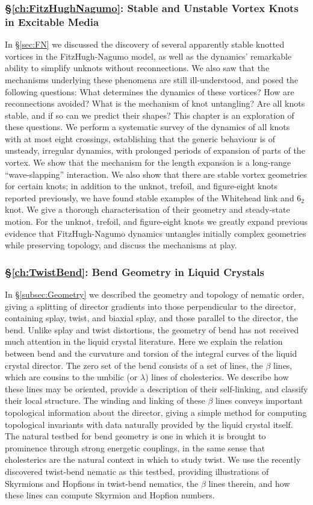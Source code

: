 \subsubsection{\S \ref{ch:FitzHughNagumo}: Stable and Unstable Vortex Knots in Excitable Media}
In \S \ref{sec:FN} we discussed the discovery of several apparently stable knotted vortices in the FitzHugh-Nagumo model, as well as the dynamics' remarkable ability to simplify unknots without reconnections. We also saw that the mechanisms underlying these phenomena are still ill-understood, and posed the following questions: What determines the dynamics of these vortices? How are reconnections avoided? What is the mechanism of knot untangling? Are all knots stable, and if so can we predict their shapes? This chapter is an exploration of these questions. We perform a systematic survey of the dynamics of all knots with at most eight crossings, establishing that the generic behaviour is of unsteady, irregular dynamics, with prolonged periods of expansion of parts of the vortex. We show that the mechanism for the length expansion is a long-range “wave-slapping” interaction. We also show that there are stable vortex geometries for certain knots; in addition to the unknot, trefoil, and figure-eight knots reported previously, we have found stable examples of the Whitehead link and $6_2$ knot. We give a thorough characterisation of their geometry and steady-state motion. For the unknot, trefoil, and figure-eight knots we greatly expand previous evidence that FitzHugh-Nagumo dynamics untangles initially complex geometries while preserving topology, and discuss the mechanisms at play.

\subsubsection{\S \ref{ch:TwistBend}: Bend Geometry in Liquid Crystals}
In \S\ref{subsec:Geometry} we described the geometry and topology of nematic order, giving a splitting of director gradients into those perpendicular to the director, containing splay, twist, and biaxial splay, and those parallel to the director, the bend. Unlike splay and twist distortions, the geometry of bend has not received much attention in the liquid crystal literature. Here we explain the relation between bend and the curvature and torsion of the integral curves of the liquid crystal director. The zero set of the bend consists of a set of lines, the $\beta$ lines, which are cousins to the umbilic (or $\lambda$) lines of cholesterics. We describe how these lines may be oriented, provide a description of their self-linking, and classify their local structure. The winding and linking of these $\beta$ lines conveys important topological information about the director, giving a simple method for computing topological invariants with data naturally provided by the liquid crystal itself. The natural testbed for bend geometry is one in which it is brought to prominence through strong energetic couplings, in the same sense that cholesterics are the natural context in which to study twist. We use the recently discovered twist-bend nematic as this testbed, providing illustrations of Skyrmions and Hopfions in twist-bend nematics, the $\beta$ lines therein, and how these lines can compute Skyrmion and Hopfion numbers.  

